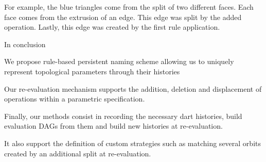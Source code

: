 \documentclass[11pt]{article}
\begin{document}
For example, the blue triangles come from the split of two different faces. Each
face comes from the extrusion of an edge. This edge was split by the added
operation. Lastly, this edge was created by the first rule application.

In conclusion

We propose rule-based persistent naming scheme allowing us to uniquely represent
topological parameters through their histories

Our re-evaluation mechanism supports the addition, deletion and displacement of
operations within a parametric specification.

Finally, our methods consist in recording the necessary dart histories, build
evaluation DAGs from them and build new histories at re-evaluation.

It also support the definition of custom strategies such as matching several
orbits created by an additional split at re-evaluation.
\end{document}

